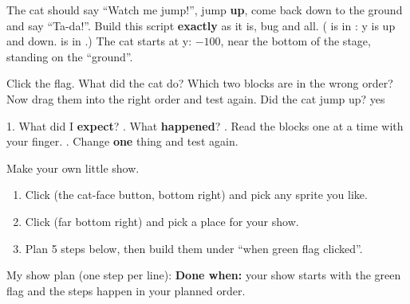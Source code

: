 \begin{exercise}
The cat should say \enquote{Watch me jump!}, jump \textbf{up}, come back down to the ground and say \enquote{Ta-da!}.
Build this script \textbf{exactly} as it is, bug and all. ( is in : y is up and down.  is in .) The cat starts at y: $-100$, near the bottom of the stage, standing on the \enquote{ground}.
\begin{center}
\begin{scratch}[scale=0.85]
\end{scratch}
\end{center}
Click the flag. What did the cat do? 
Which two blocks are in the wrong order? 
Now drag them into the right order and test again. Did the cat jump up? \tickbox{} yes
\end{exercise}

\begin{tip}
1. What did I \textbf{expect}? . What \textbf{happened}? . Read the blocks one at a time with your finger. . Change \textbf{one} thing and test again.
\end{tip}

\begin{exercise}
Make your own little show.
\begin{enumerate}[leftmargin=1.4em,itemsep=1pt]
  \item Click  (the cat-face button, bottom right) and pick any sprite you like.
  \item Click  (far bottom right) and pick a place for your show.
  \item Plan 5 steps below, then build them under \enquote{when green flag clicked}.
\end{enumerate}
My show plan (one step per line):
\textbf{Done when:} your show starts with the green flag and the steps happen in your planned order.
\end{exercise}

